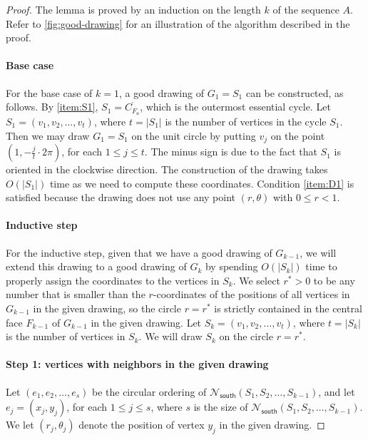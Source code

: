 \documentclass{theoretics}
\newcommand{\FO}{F_\mathsf{o}}
\newcommand{\Nsouth}{\mathcal{N}_\mathsf{south}}
\begin{document}
\begin{proof} The lemma is proved by an induction on the length $k$  of the sequence $A$. Refer to \cref{fig:good-drawing} for an illustration of the algorithm described in the proof.

\paragraph{Base case}
For the base case of $k=1$, a good drawing of $G_1 = S_1$ can be constructed, as follows. By \ref{item:S1},  $S_1 = \overline{C_{\FO}}$, which is the outermost essential cycle. Let $S_1 = (v_1, v_2, \ldots, v_t)$, where $t = |S_1|$ is the number of vertices in the cycle $S_1$. Then we may draw $G_1 = S_1$ on the unit circle by putting $v_j$ on the point $\left(1, -\frac{j}{t} \cdot 2\pi \right)$, for each $1 \leq j \leq t$. The minus sign is due to the fact that $S_1$ is oriented in the clockwise direction. The construction of the drawing takes $O\left(|S_1|\right)$ time as we need to compute these coordinates. Condition \ref{item:D1} is satisfied because the drawing does not use any point $(r,\theta)$ with $0\leq r<1$. 


\paragraph{Inductive step}
For the inductive step, given that we have a good drawing of $G_{k-1}$, we will extend this drawing to a good drawing of $G_{k}$ by spending $O\left(|S_k|\right)$ time to properly assign the coordinates to the vertices in $S_k$. We select $r^\ast > 0$ to be any number that is smaller than the $r$-coordinates of the positions of all vertices in $G_{k-1}$ in the given drawing, so the circle $r = r^\ast$ is strictly contained in the central face $F_{k-1}$ of $G_{k-1}$ in the given drawing. 
Let $S_k = (v_1, v_2, \ldots, v_t)$, where $t = |S_k|$ is the number of vertices in $S_k$.  We will draw $S_k$ on the circle $r = r^\ast$.

\paragraph{Step 1: vertices with neighbors in the given drawing}
Let $(e_1, e_2, \ldots, e_s)$ be the circular ordering of $\Nsouth(S_1, S_2, \ldots, S_{k-1})$, and let $e_j=(x_j, y_j)$, for each $1 \leq j \leq s$, where $s$ is the size of $\Nsouth(S_1, S_2, \ldots, S_{k-1})$.  We let $(r_j, \theta_j)$ denote the position of vertex $y_j$ in the given drawing.


\end{proof}
\end{document}
